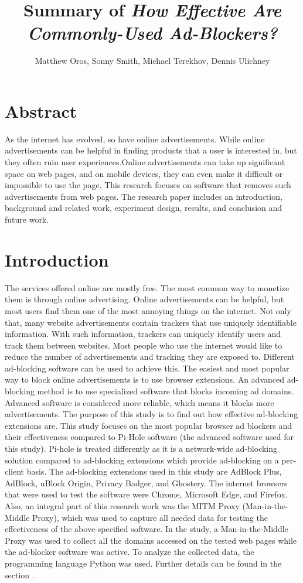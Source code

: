 \documentclass[sigsmall]{acmart}
\title{Summary of \emph{How Effective Are Commonly-Used Ad-Blockers?}}
\author{Matthew Oros, Sonny Smith, Michael Terekhov, Dennis Ulichney}
\begin{document}
\maketitle


\section*{Abstract}
As the internet has evolved, so have online advertisements. While online advertisements can be helpful in finding products that a user is interested in, but they often ruin user experiences.Online advertisements can take up significant space on web pages, and on mobile devices, they can even make it difficult or impossible to use the page. This research focuses on software that removes such advertisements from web pages. The research paper includes an introduction, background and related work, experiment design, results, and conclusion and future work.  

\section*{Introduction}
The services offered online are mostly free. The most common way to monetize them is through online advertising. Online advertisements can be helpful, but most users find them one of the most annoying things on the internet. Not only that, many website advertisements contain trackers that use uniquely identifiable information. With such information, trackers can uniquely identify users and track them between websites. Most people who use the internet would like to reduce the number of advertisements and tracking they are exposed to. Different ad-blocking software can be used to achieve this. The easiest and most popular way to block online advertisements is to use browser extensions. An advanced ad-blocking method is to use specialized software that blocks incoming ad domains. Advanced software is considered more reliable, which means it blocks more advertisements. The purpose of this study is to find out how effective ad-blocking extensions are. This study focuses on the most popular browser ad blockers and their effectiveness compared to Pi-Hole software (the advanced software used for this study). Pi-hole is treated differently as it is a network-wide ad-blocking solution compared to ad-blocking extensions which provide ad-blocking on a per-client basis. The ad-blocking extensions used in this study are AdBlock Plus, AdBlock, uBlock Origin, Privacy Badger, and Ghostery. The internet browsers that were used to test the software were Chrome, Microsoft Edge, and Firefox. Also, an integral part of this research work was the MITM Proxy (Man-in-the-Middle Proxy), which was used to capture all needed data for testing the effectiveness of the above-specified software. In the study, a Man-in-the-Middle Proxy was used to collect all the domains accessed on the tested web pages while the ad-blocker software was active. To analyze the collected data, the programming language Python was used. Further details can be found in the section . 
\end{document}
